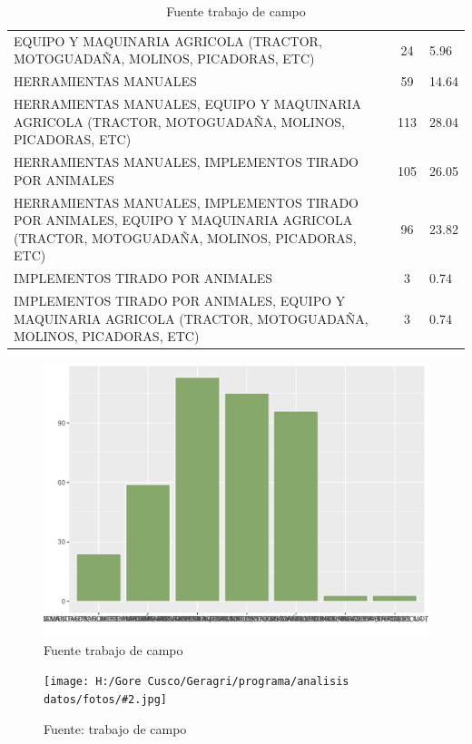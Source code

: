 \documentclass{article}\usepackage[]{graphicx}\usepackage[table]{xcolor}
\makeatletter
\def\maxwidth{ %
  \ifdim\Gin@nat@width>\linewidth
    \linewidth
  \else
    \Gin@nat@width
  \fi
}
\newenvironment{knitrout}{}{} %
\newenvironment{tablas}[2]
{\begin{table}[H]
		\centering
		\caption{#1}
		#2
		\caption*{Fuente trabajo de campo}}
	{\end{table}}
\newenvironment{fotos}[2]
{\begin{figure}[H]
	\centering
	\caption{#1}
	\texttt{[image: H:/Gore Cusco/Geragri/programa/analisis datos/fotos/\#2.jpg]}
	\caption*{Fuente: trabajo de campo}}
{\end{figure}}
\newenvironment{graficas}[2]
{\begin{figure}[H]
		\centering
		\caption{#1}
		#2
		\caption*{Fuente trabajo de campo}}
{\end{figure}}
\makeatother
\begin{document}
\begin{tablas}
{Insumos que usa para la produccion y cosecha}{

\begin{tabular}{lcl}
\toprule
\cellcolor[HTML]{87A96B}{\textcolor{black}{\textbf{Insumo}}} & \cellcolor[HTML]{87A96B}{\textcolor{black}{\textbf{Conteo}}} & \cellcolor[HTML]{87A96B}{\textcolor{black}{\textbf{Porcentaje}}}\\
\midrule
EQUIPO Y MAQUINARIA AGRICOLA (TRACTOR, MOTOGUADAÑA, MOLINOS, PICADORAS, ETC) & 24 & 5.96\\
HERRAMIENTAS MANUALES & 59 & 14.64\\
HERRAMIENTAS MANUALES, EQUIPO Y MAQUINARIA AGRICOLA (TRACTOR, MOTOGUADAÑA, MOLINOS, PICADORAS, ETC) & 113 & 28.04\\
HERRAMIENTAS MANUALES, IMPLEMENTOS TIRADO POR ANIMALES & 105 & 26.05\\
HERRAMIENTAS MANUALES, IMPLEMENTOS TIRADO POR ANIMALES, EQUIPO Y MAQUINARIA AGRICOLA (TRACTOR, MOTOGUADAÑA, MOLINOS, PICADORAS, ETC) & 96 & 23.82\\
\addlinespace
IMPLEMENTOS TIRADO POR ANIMALES & 3 & 0.74\\
IMPLEMENTOS TIRADO POR ANIMALES, EQUIPO Y MAQUINARIA AGRICOLA (TRACTOR, MOTOGUADAÑA, MOLINOS, PICADORAS, ETC) & 3 & 0.74\\
\bottomrule
\end{tabular}


}
\end{tablas}
\begin{graficas}
{Insumos que usa para la produccion y cosecha}{
\begin{knitrout}
\definecolor{shadecolor}{rgb}{0.969, 0.969, 0.969}\color{fgcolor}
\includegraphics[width=\maxwidth]{figure/fig_cuarentayuno-1} 
\end{knitrout}
}
\end{graficas}
\begin{fotos}
{trabajo de campo}{39}
\end{fotos}
\end{document}
